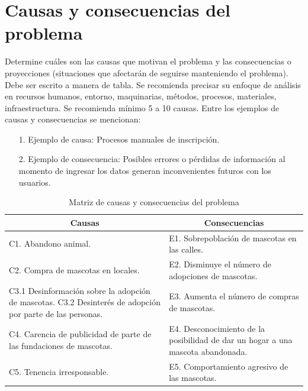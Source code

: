 \documentclass[12pt, a4paper, nofontenc, numbers=endperiod]{apa7}
\begin{document}
{	\section{\normalsize \centering Causas y consecuencias del problema} 
	\setlength{\parindent}{1.27cm}Determine cuáles son las causas que motivan el problema y las consecuencias o proyecciones (situaciones que afectarán de seguirse manteniendo el problema).
	Debe ser escrito a manera de tabla. Se recomienda precisar su enfoque de análisis en recursos humanos, entorno, maquinarias, métodos, procesos, materiales, infraestructura. Se recomienda mínimo 5 a 10 causas. Entre los ejemplos de causas y consecuencias se mencionan:
	{\doublespacing	
	\begin{itemize}[leftmargin=1.70cm]
		\item[1.] Ejemplo de causa: Procesos manuales de inscripción.
		\item[2.] Ejemplo de consecuencia: Posibles errores o pérdidas de información al momento de ingresar los datos generan inconvenientes futuros con los usuarios.
	\end{itemize}
}
	\begin{table}[h]
		\caption{Matriz de causas y consecuencias del problema}
		\label{Tabla2} %

		{\renewcommand{\arraystretch}{1.5} 
			\begin{tabular}{p{6cm}p{9.1cm}}
				\toprule
				\multicolumn{1}{c}{Causas} &  \multicolumn{1}{c}{Consecuencias} \\
				\midrule
				C1. Abandono animal. &  E1. Sobrepoblación de mascotas en las calles. \\
				
				C2. Compra de mascotas en locales. &  E2. Disminuye el número de adopciones de mascotas.\\
				
				C3.1 Desinformación sobre la adopción de mascotas.
				C3.2 Desinterés de adopción por parte de las personas.
				&  E3. Aumenta el número de compras de mascotas.\\
				
				C4. Carencia de publicidad de parte de las fundaciones de mascotas. &  E4. Desconocimiento de la posibilidad de dar un hogar a una mascota abandonada. \\
				
				C5. Tenencia irresponsable. &  E5. Comportamiento agresivo de las mascotas. \\
				

\end{tabular}}
\end{table}}
\end{document}
